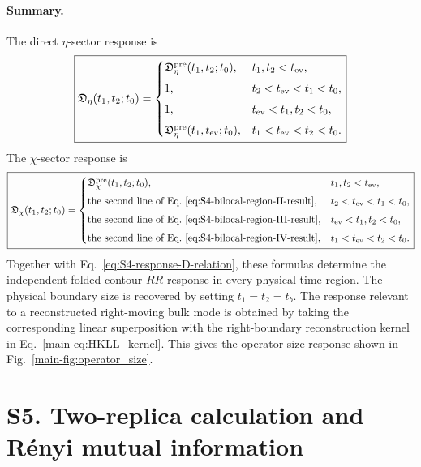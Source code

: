 \documentclass[11pt,a4paper]{article}
\begin{document}
\paragraph*{Summary.}

The direct \(\eta\)-sector response is
\begin{equation}
\boxed{
  \mathfrak D_\eta(t_1,t_2;t_0)
  =
  \begin{cases}
  \mathfrak D^{\rm pre}_\eta(t_1,t_2;t_0),
  &
  t_1,t_2<t_{\rm ev},
  \\[4pt]
  1,
  &
  t_2<t_{\rm ev}<t_1<t_0,
  \\[4pt]
  1,
  &
  t_{\rm ev}<t_1,t_2<t_0,
  \\[4pt]
  \mathfrak D^{\rm pre}_\eta(t_1,t_{\rm ev};t_0),
  &
  t_1<t_{\rm ev}<t_2<t_0 .
  \end{cases}
}
\label{eq:S4-Deta-regions}
\end{equation}
The \(\chi\)-sector response is
\begin{equation}
\boxed{
  \mathfrak D_\chi(t_1,t_2;t_0)
  =
  \begin{cases}
  \mathfrak D^{\rm pre}_\chi(t_1,t_2;t_0),
  &
  t_1,t_2<t_{\rm ev},
  \\[4pt]
  \text{the second line of
  Eq.~\eqref{eq:S4-bilocal-region-II-result},}
  &
  t_2<t_{\rm ev}<t_1<t_0,
  \\[4pt]
  \text{the second line of
  Eq.~\eqref{eq:S4-bilocal-region-III-result},}
  &
  t_{\rm ev}<t_1,t_2<t_0,
  \\[4pt]
  \text{the second line of
  Eq.~\eqref{eq:S4-bilocal-region-IV-result},}
  &
  t_1<t_{\rm ev}<t_2<t_0 .
  \end{cases}
}
\label{eq:S4-Dchi-regions}
\end{equation}
Together with Eq.~\eqref{eq:S4-response-D-relation}, these formulas determine
the independent folded-contour \(RR\) response in every physical time region.
The physical boundary size is recovered by setting \(t_1=t_2=t_b\). The
response relevant to a reconstructed right-moving bulk mode is obtained by
taking the corresponding linear superposition with the right-boundary
reconstruction kernel in Eq.~\eqref{main-eq:HKLL_kernel}. This gives the
operator-size response shown in Fig.~\ref{main-fig:operator_size}.

\section*{S5. Two-replica calculation and R\'enyi mutual information}
\end{document}
